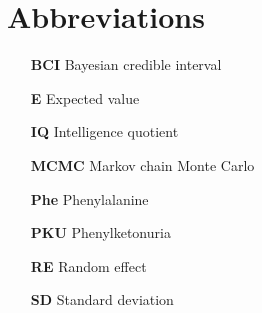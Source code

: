 \documentclass{svjour3}                     %
\begin{document}

\section{Abbreviations} %
\label{sec:abbreviations}
\begin{itemize}
    \item[\textbf{BCI}] Bayesian credible interval
    \item[\textbf{E}] Expected value
    \item[\textbf{IQ}] Intelligence quotient
    \item[\textbf{MCMC}] Markov chain Monte Carlo
    \item[\textbf{Phe}] Phenylalanine
    \item[\textbf{PKU}] Phenylketonuria
    \item[\textbf{RE}] Random effect
    \item[\textbf{SD}] Standard deviation
\end{itemize}





\end{document}
